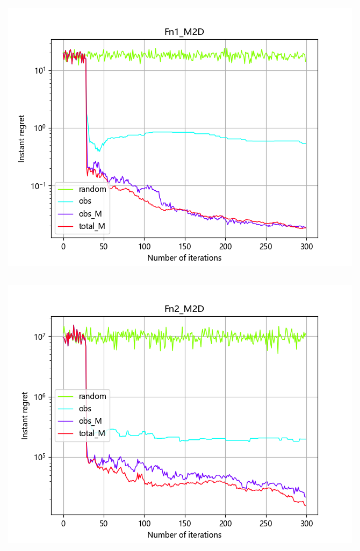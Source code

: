 \documentclass{article}
\begin{document}
\begin{figure}[H]
    \centering
    \begin{subfigure}[t]{.32\linewidth}
        \centering
        \includegraphics[width=1\textwidth]{pictures/Homo_noise_2D_onlyEI/Fn1_M2D_ins.png}
    \end{subfigure}
    \begin{subfigure}[t]{.32\linewidth}
        \centering
        \includegraphics[width=1\textwidth]{pictures/Homo_noise_2D_onlyEI/Fn2_M2D_ins.png}
    \end{subfigure}
    \begin{subfigure}[t]{.32\linewidth}
        \centering

\end{subfigure}
\end{figure}
\end{document}
